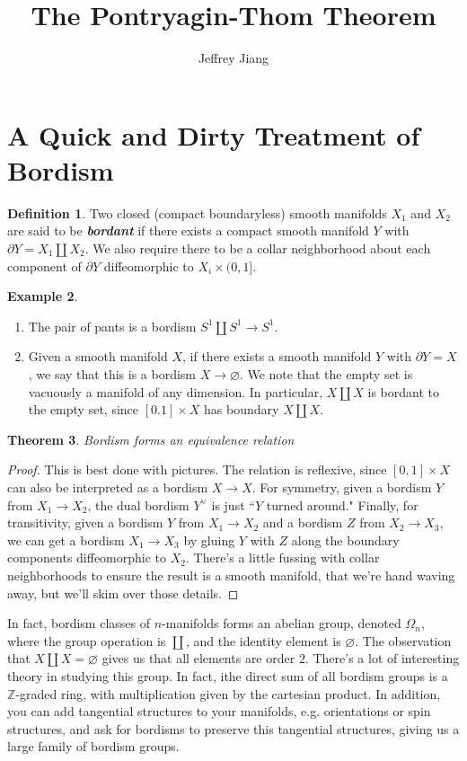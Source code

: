 \documentclass[psamsfonts]{amsart}
\newtheorem{thm}{Theorem}[section]
\theoremstyle{definition}
\newtheorem{defn}[thm]{Definition}
\newtheorem{exmp}[thm]{Example}
\theoremstyle{remark}
\renewcommand{\emptyset}{\varnothing}
\newcommand{\ib}[1]{\textbf{\textit{#1}}}
\newcommand{\Z}{\mathbb{Z}}
\newcommand{\enumbreak}{\ \\ \vspace{-\baselineskip}}
\newcommand{\bd}{\partial}
\begin{document}
\author{Jeffrey Jiang}
\title{The Pontryagin-Thom Theorem}
\maketitle
\setcounter{section}{1}
\section*{A Quick and Dirty Treatment of Bordism}
%
\begin{defn}
Two closed (compact boundaryless) smooth manifolds $X_1$ and $X_2$ are said to be \ib{bordant} if there exists a compact smooth manifold  $Y$ with $\bd Y = X_1 \coprod X_2$. We also require there to be a collar neighborhood about each component of $\bd Y$ diffeomorphic to $X_i \times (0,1]$.
\end{defn}
%
\begin{exmp}\enumbreak
\begin{enumerate}
\item The pair of pants is a bordism $S^1 \coprod S^1 \to S^1$.
\item Given a smooth manifold $X$, if there exists a smooth manifold $Y$ with $\bd Y = X$, we say that this is a bordism $X \to \emptyset$. We note that the empty set is vacuously a manifold of any dimension. In particular, $X \coprod X$ is bordant to the empty set, since $[0.1] \times X$ has boundary $X \coprod X$.
\end{enumerate}
\end{exmp}
%
\begin{thm}
Bordism forms an equivalence relation
\end{thm}
%
\begin{proof}
This is best done with pictures. The relation is reflexive, since $[0,1] \times X$ can also be interpreted as a bordism $X \to X$. For symmetry, given a bordism $Y$ from $X_1 \to X_2$, the dual bordism $Y^\vee$ is just ``$Y$ turned around." Finally, for transitivity, given a bordism $Y$ from $X_1 \to X_2$ and a bordism $Z$ from $X_2 \to X_3$, we can get a bordism $X_1 \to X_3$ by gluing $Y$ with $Z$ along the boundary components diffeomorphic to $X_2$. There's a little fussing with collar neighborhoods to ensure the result is a smooth manifold, that we're hand waving away, but we'll skim over those details.
\end{proof}
In fact, bordism classes of $n$-manifolds forms an abelian group, denoted $\Omega_n$, where the group operation is $\coprod$, and the identity element is $\emptyset$. The observation that $X \coprod X = \emptyset$ gives us that all elements are order $2$. There's a lot of interesting theory in studying this group. In fact, ithe direct sum of all bordism groups is a $\Z$-graded ring, with multiplication given by the cartesian product. In addition, you can add tangential structures to your manifolds, e.g. orientations or spin structures, and ask for bordisms to preserve this tangential structures, giving us a large family of bordism groups. 
%
\setcounter{section}{2}
%
\setcounter{thm}{0}
%
\end{document}
